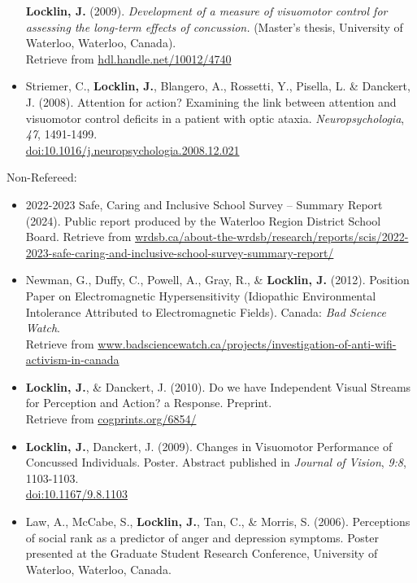 \documentclass[10pt]{article}
\begin{document}
\begin{itemize}
  \textbf{Locklin, J.} (2009). \emph{Development of a measure of
  visuomotor control for assessing the long-term effects of concussion.}
  (Master's thesis, University of Waterloo, Waterloo, Canada).\\
  Retrieve from
  \href{http://hdl.handle.net/10012/4740}{hdl.handle.net/10012/4740}
\item
  Striemer, C., \textbf{Locklin, J.}, Blangero, A., Rossetti, Y.,
  Pisella, L. \& Danckert, J. (2008). Attention for action? Examining
  the link between attention and visuomotor control deficits in a
  patient with optic ataxia. \emph{Neuropsychologia}, \emph{47},
  1491-1499.\\
  \href{http://dx.doi.org/10.1016/j.neuropsychologia.2008.12.021}{doi:10.1016/j.neuropsychologia.2008.12.021}
\end{itemize}

Non-Refereed:

\begin{itemize}
\item
  2022-2023 Safe, Caring and Inclusive School Survey -- Summary Report
  (2024). Public report produced by the Waterloo Region District School
  Board. Retrieve from
  \href{https://www.wrdsb.ca/about-the-wrdsb/research/reports/scis/2022-2023-safe-caring-and-inclusive-school-survey-summary-report/}{wrdsb.ca/about-the-wrdsb/research/reports/scis/2022-2023-safe-caring-and-inclusive-school-survey-summary-report/}
\item
  Newman, G., Duffy, C., Powell, A., Gray, R., \& \textbf{Locklin, J.}
  (2012). Position Paper on Electromagnetic Hypersensitivity (Idiopathic
  Environmental Intolerance Attributed to Electromagnetic Fields).
  Canada: \emph{Bad Science Watch}.\\
  Retrieve from
  \href{http://www.badsciencewatch.ca/projects/investigation-of-anti-wifi-activism-in-canada}{www.badsciencewatch.ca/projects/investigation-of-anti-wifi-activism-in-canada}
\item
  \textbf{Locklin, J.}, \& Danckert, J. (2010). Do we have Independent
  Visual Streams for Perception and Action? a Response. Preprint.\\
  Retrieve from \href{http://cogprints.org/6854/}{cogprints.org/6854/}
\item
  \textbf{Locklin, J.}, Danckert, J. (2009). Changes in Visuomotor
  Performance of Concussed Individuals. Poster. Abstract published in
  \emph{Journal of Vision}, \emph{9:8}, 1103-1103.\\
  \href{http://dx.doi.org/10.1167/9.8.1103}{doi:10.1167/9.8.1103}
\item
  Law, A., McCabe, S., \textbf{Locklin, J.}, Tan, C., \& Morris, S.
  (2006). Perceptions of social rank as a predictor of anger and
  depression symptoms. Poster presented at the Graduate Student Research
  Conference, University of Waterloo, Waterloo, Canada.
\end{itemize}

\pagebreak[3]
\end{document}
